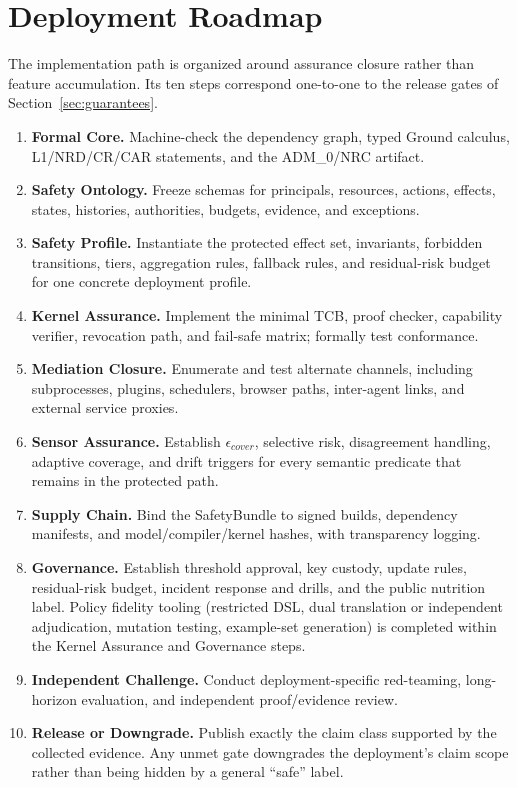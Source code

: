 \documentclass[11pt]{article}
\def\ensuremath#1{#1}%
\def\mathrm#1{#1}%
\def\mathsf#1{#1}%
\newcommand{\ADM}{\texorpdfstring{\ensuremath{\mathrm{ADM}_0}}{ADM0}}
\newcommand{\epscover}{\ensuremath{\epsilon_{\mathrm{cover}}}}
\newcommand{\Ground}{\ensuremath{\mathsf{Ground}}}
\newcommand{\SafetyBundle}{\textsf{SafetyBundle}}
\begin{document}
\section{Deployment Roadmap}\label{app:roadmap}
The implementation path is organized around assurance closure rather than feature accumulation. Its ten steps correspond one-to-one to the release gates of Section~\ref{sec:guarantees}.
\begin{enumerate}
\item \textbf{Formal Core.} Machine-check the dependency graph, typed \Ground{} calculus, L1/NRD/CR/CAR statements, and the \ADM{}/NRC artifact.
\item \textbf{Safety Ontology.} Freeze schemas for principals, resources, actions, effects, states, histories, authorities, budgets, evidence, and exceptions.
\item \textbf{Safety Profile.} Instantiate the protected effect set, invariants, forbidden transitions, tiers, aggregation rules, fallback rules, and residual-risk budget for one concrete deployment profile.
\item \textbf{Kernel Assurance.} Implement the minimal TCB, proof checker, capability verifier, revocation path, and fail-safe matrix; formally test conformance.
\item \textbf{Mediation Closure.} Enumerate and test alternate channels, including subprocesses, plugins, schedulers, browser paths, inter-agent links, and external service proxies.
\item \textbf{Sensor Assurance.} Establish \(\epscover\), selective risk, disagreement handling, adaptive coverage, and drift triggers for every semantic predicate that remains in the protected path.
\item \textbf{Supply Chain.} Bind the \SafetyBundle{} to signed builds, dependency manifests, and model/compiler/kernel hashes, with transparency logging.
\item \textbf{Governance.} Establish threshold approval, key custody, update rules, residual-risk budget, incident response and drills, and the public nutrition label. Policy fidelity tooling (restricted DSL, dual translation or independent adjudication, mutation testing, example-set generation) is completed within the Kernel Assurance and Governance steps.
\item \textbf{Independent Challenge.} Conduct deployment-specific red-teaming, long-horizon evaluation, and independent proof/evidence review.
\item \textbf{Release or Downgrade.} Publish exactly the claim class supported by the collected evidence. Any unmet gate downgrades the deployment's claim scope rather than being hidden by a general ``safe'' label.
\end{enumerate}
\end{document}
